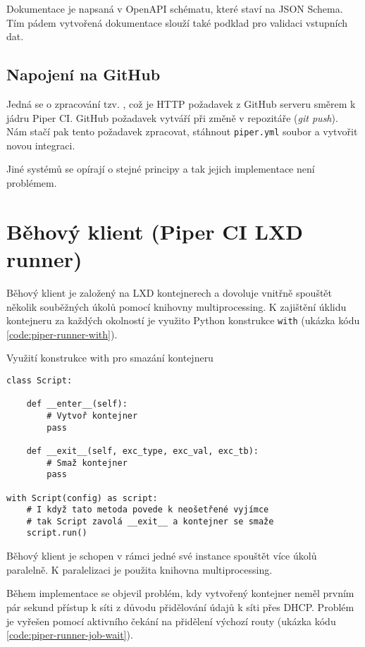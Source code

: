 Dokumentace je napsaná v OpenAPI schématu, které staví na JSON Schema.
Tím pádem vytvořená dokumentace slouží také podklad pro validaci vstupních dat.

\subsection{Napojení na GitHub}

Jedná se o zpracování tzv. , což je HTTP požadavek z GitHub serveru směrem k jádru Piper CI.
GitHub požadavek vytváří při změně v repozitáře (\textit{git push}).
Nám stačí pak tento požadavek zpracovat, stáhnout \verb|piper.yml| soubor a vytvořit novou integraci.

Jiné systémů se opírají o stejné principy a tak jejich implementace není problémem.

\section{Běhový klient (Piper CI LXD runner)}

Běhový klient je založený na LXD kontejnerech a dovoluje vnitřně spouštět několik souběžných úkolů pomocí knihovny multiprocessing.
K zajištění úklidu kontejneru za každých okolností je využito Python konstrukce \verb|with| (ukázka kódu \ref{code:piper-runner-with}).

\begin{listing}[ht]
\caption{\label{code:piper-runner-with}Využití konstrukce with pro smazání kontejneru}
\begin{verbatim}
class Script:

    def __enter__(self):
        # Vytvoř kontejner
        pass

    def __exit__(self, exc_type, exc_val, exc_tb):
        # Smaž kontejner
        pass

with Script(config) as script:
    # I když tato metoda povede k neošetřené vyjímce
    # tak Script zavolá __exit__ a kontejner se smaže
    script.run()
\end{verbatim}
\end{listing}

Běhový klient je schopen v rámci jedné své instance spouštět více úkolů paralelně.
K paralelizaci je použita knihovna multiprocessing.

Během implementace se objevil problém, kdy vytvořený kontejner neměl prvním pár sekund přístup k síti z důvodu přidělování údajů k síti přes DHCP.
Problém je vyřešen pomocí aktivního čekání na přidělení výchozí routy (ukázka kódu \ref{code:piper-runner-job-wait}).

